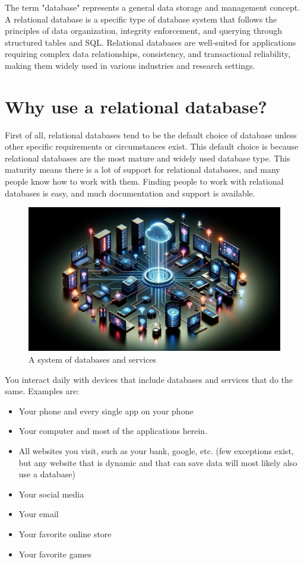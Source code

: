 The term "database" represents a general data storage and management concept. A relational database is a specific type of database system that follows the principles of data organization, integrity enforcement, and querying through structured tables and SQL. Relational databases are well-suited for applications requiring complex data relationships, consistency, and transactional reliability, making them widely used in various industries and research settings.

\section{Why use a relational database?}
First of all, relational databases tend to be the default choice of database unless other specific requirements or circumstances exist. This default choice is because relational databases are the most mature and widely used database type. This maturity means there is a lot of support for relational databases, and many people know how to work with them. Finding people to work with relational databases is easy, and much documentation and support is available.

\begin{figure}[htbp]
    \centering
    \includegraphics[width=1\textwidth]{content/1-relational-databases/figures/i1-databases-everywhere.png}
    \caption{A system of databases and services}
    \label{fig:0.i1-databases-everywhere.png}
\end{figure}

You interact daily with devices that include databases and services that do the same. Examples are:

\begin{itemize}
    \item Your phone and every single app on your phone
    \item Your computer and most of the applications herein.
    \item All websites you visit, such as your bank, google, etc. (few exceptions exist, but any website that is dynamic and that can save data will most likely also use a database)
    \item Your social media
    \item Your email
    \item Your favorite online store
    \item Your favorite games
\end{itemize}

